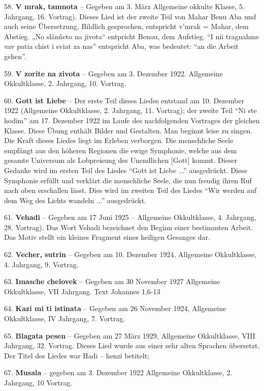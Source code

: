 \documentclass[11pt,a5paper,twoside]{article}
\begin{document}
58. \textbf{V mrak, tamnota} -- Gegeben am 3. März Allgemeine okkulte Klasse, 5. Jahrgang, 16. Vortrag). Dieses Lied ist der zweite Teil von Mahar Benu Aba und auch seine Übersetzung. Bildlich gesprochen, entspricht v’mrak = Mahar, dem Abstieg. „No slånñeto na jivota“ entpricht Benou, dem Aufstieg. "`I nii tragnahme vav patia chist i sviat za nas"' entspricht Aba, was bedeutet: "`an die Arbeit gehen"'.

59. \textbf{V zorite na zivota} -- Gegeben am 3. Dezember 1922. Allgemeine Okkultklasse, 2. Jahrgang, 10. Vortrag.

60. \textbf{Gott ist Liebe} -- Der erste Teil dieses Liedes entstand am 10. Dezember 1922 (Allgemeine Okkultklasse, 2. Jahrgang, 11. Vortrag); der zweite Teil "`Ni ste hodim"' am 17. Dezember 1922 im Laufe des nachfolgenden Vortrages der gleichen Klasse. Diese Übung enthält Bilder und Gestalten. Man beginnt leise zu singen. Die Kraft dieses Liedes liegt im Erleben verborgen. Die menschliche Seele empfängt aus den höheren Regionen die ewige Symphonie, welche aus dem gesamte Universum als Lobpreisung des Unendlichen [Gott] kommt. Dieser Gedanke wird im ersten Teil des Liedes "`Gott ist Liebe ..."' ausgedrückt. Diese Symphonie erfüllt und verklärt die menschliche Seele, die nun freudig ihren Ruf nach oben erschallen lässt. Dies wird im zweiten Teil des Liedes "`Wir werden auf dem Weg des Lichts wandeln ..."' ausgedrückt. 

61. \textbf{Vehadi} -- Gegeben am 17 Juni 1925 -- Allgemeine Okkultklasse, 4. Jahrgang, 28. Vortrag). Das Wort Vehadi bezeichnet den Beginn einer bestimmten Arbeit. Das Motiv stellt ein kleines Fragment eines heiligen Gesanges dar.

62. \textbf{Vecher, sutrin} -- Gegeben am 10. Dezember 1924, Allgemeine Okkultklasse, 4. Jahrgang, 9. Vortrag.

63. \textbf{Imasche chelovek} -- Gegeben am 30 November 1927 Allgemeine Okkultklasse, VII Jahrgang. Text Johannes 1,6-13

64. \textbf{Kazi mi ti istinata} -- Gegeben am 26 November 1924, Allgemeine Okkultklasse, IV Jahrgang, 7. Vortrag.

65. \textbf{Blagata pesen} -- Gegeben am 27 März 1929, Allgemeine Okkultklasse, VIII Jahrgang, 32. Vortrag. Dieses Lied wurde aus einer sehr alten Sprachen übersetzt. Der Titel des Liedes war Hadi -- henzi betitelt; 

67. \textbf{Musala} -- gegeben am 3. Dezember 1922 Allgemeine Okkultklasse, 2. Jahrgang, 10 Vortrag. 
\end{document}
